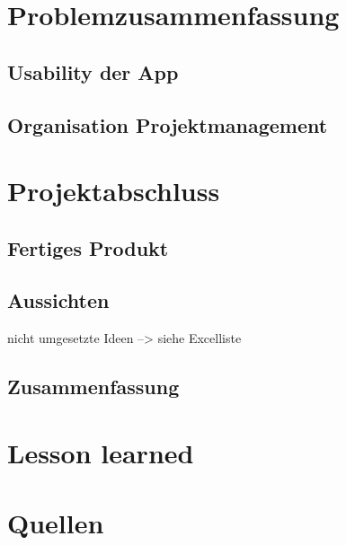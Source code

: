 \documentclass[12pt,a4paper]{article}
\begin{document}
\section{Problemzusammenfassung}
\subsection{Usability der App}
\newpage
\subsection{Organisation Projektmanagement}
\newpage
\section{Projektabschluss}
\subsection{Fertiges Produkt}
\subsection{Aussichten}
nicht umgesetzte Ideen --> siehe Excelliste
\newpage
\subsection{Zusammenfassung}
\newpage
\section{Lesson learned}
\newpage
\section*{Quellen}
\end{document}
